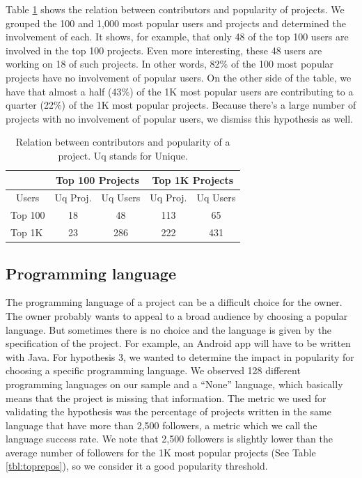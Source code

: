 Table \ref{tbl:contributors} shows the relation between contributors and popularity of projects. We grouped the 100 and 1,000 most popular users and projects and determined the involvement of each. It shows, for example, that only 48 of the top 100 users are involved in the top 100 projects. Even more interesting, these 48 users are working on 18 of such projects. In other words, 82\% of the 100 most popular projects have no involvement of popular users. On the other side of the table, we have that almost a half (43\%) of the 1K most popular users are contributing to a quarter (22\%) of the 1K most popular projects. Because there's a large number of projects with no involvement of popular users, we dismiss this hypothesis as well.
\begin{table}
\centering
\begin{tabular}{ | l | c | c | c | c | }
	\hline
	\- & \multicolumn{2}{|c|}{Top 100 Projects} & \multicolumn{2}{|c|}{Top 1K Projects} \\ \hline
	\multicolumn{1}{|c|}{Users} & Uq Proj. & Uq Users & Uq Proj. & Uq Users \\ \hline
	Top 100 & 18 & 48 & 113 & 65 \\ \hline
	Top 1K & 23 & 286 & 222 & 431 \\ \hline
\end{tabular}
\caption{Relation between contributors and popularity of a project. Uq stands for Unique.}
\label{tbl:contributors}
\end{table}

\subsection{Programming language}

The programming language of a project can be a difficult choice for the owner. The owner probably wants to appeal to a broad audience by choosing a popular language. But sometimes there is no choice and the language is given by the specification of the project. For example, an Android app will have to be written with Java. For hypothesis 3, we wanted to determine the impact in popularity for choosing a specific programming language. We observed 128 different programming languages on our sample and a ``None'' language, which basically means that the project is missing that information. The metric we used for validating the hypothesis was the percentage of projects written in the same language that have more than 2,500 followers, a metric which we call the language success rate. We note that 2,500 followers is slightly lower than the average number of followers for the 1K most popular projects (See Table \ref{tbl:toprepos}), so we consider it a good popularity threshold.

